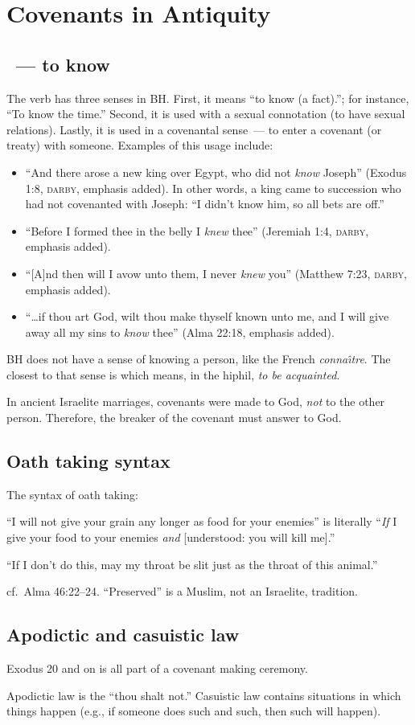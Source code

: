 \section{Covenants in Antiquity}\label{app:covenants-in-antiquity}
\subsection{~--- to know}
The verb  has three senses in BH. First, it means ``to know (a fact).''; for instance, ``To know the time.'' Second, it is used with a sexual connotation (to have sexual relations). Lastly, it is used in a covenantal sense~--- to enter a covenant (or treaty) with someone. Examples of this usage include:
\begin{itemize}
    \item ``And there arose a new king over Egypt, who did not \emph{know} Joseph'' (Exodus 1:8, \textsc{darby}, emphasis added). In other words, a king came to succession who had not covenanted with Joseph: ``I didn't know him, so all bets are off.''
    \item ``Before I formed thee in the belly I \emph{knew} thee'' (Jeremiah 1:4, \textsc{darby}, emphasis added).
    \item ``[A]nd then will I avow unto them, I never \emph{knew} you'' (Matthew 7:23, \textsc{darby}, emphasis added).
    \item ``\dots if thou art God, wilt thou make thyself known unto me, and I will give away all my sins to \emph{know} thee'' (Alma 22:18, emphasis added).
\end{itemize}

BH does not have a sense of knowing a person, like the French \emph{conna\^\i tre}. The closest to that sense is  which means, in the hiphil, \emph{to be acquainted}.

In ancient Israelite marriages, covenants were made to God, \emph{not} to the other person. Therefore, the breaker of the covenant must answer to God.

\subsection{Oath taking syntax}
The syntax of oath taking:

``I will not give your grain any longer as food for your enemies'' is literally ``\emph{If} I give your food to your enemies \emph{and} [understood: you will kill me].''

``If I don't do this, may my throat be slit just as the throat of this animal.''

cf.\ Alma 46:22--24. ``Preserved'' is a Muslim, not an Israelite, tradition.

\subsection{Apodictic and casuistic law}
Exodus 20 and on is all part of a covenant making ceremony.

Apodictic law is the ``thou shalt not.'' Casuistic law contains situations in which things happen (e.g., if someone does such and such, then such will happen).
